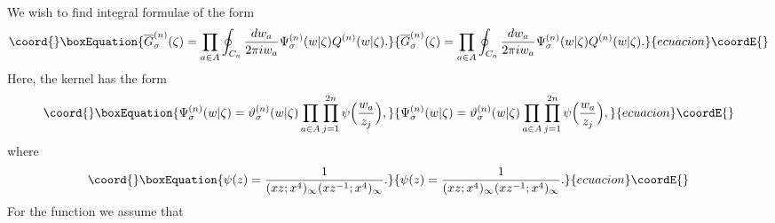 \documentclass[a4paper,10pt]{article}
\begin{document}
We wish to find integral formulae of the form 
\begin{equation}\coord{}\boxEquation{
\overline{G}_{\sigma}^{(n)} 
(\zeta)=\prod_{a\in A}\oint_{C_a} 
\dfrac{dw_a}{2\pi iw_a} 
\Psi_{\sigma}^{(n)} (w|\zeta )
Q^{(n)}(w|\zeta). 
\label{eq:G-form}
}{
\overline{G}_{\sigma}^{(n)} 
(\zeta)=\prod_{a\in A}\oint_{C_a} 
\dfrac{dw_a}{2\pi iw_a} 
\Psi_{\sigma}^{(n)} (w|\zeta )
Q^{(n)}(w|\zeta). 
}{ecuacion}\coordE{}\end{equation}
Here, the kernel has the form 
\begin{equation}\coord{}\boxEquation{
\Psi^{(n)}_\sigma (w| \zeta )=
\vartheta^{(n)}_\sigma (w | \zeta )
\prod_{a\in A}\prod_{j=1}^{2n} 
\psi \Bigl(\frac{w_{a}}{z_j}\Bigr),
\label{eq:df-Psi}
}{
\Psi^{(n)}_\sigma (w| \zeta )=
\vartheta^{(n)}_\sigma (w | \zeta )
\prod_{a\in A}\prod_{j=1}^{2n} 
\psi \Bigl(\frac{w_{a}}{z_j}\Bigr),
}{ecuacion}\coordE{}\end{equation}
where
\begin{equation}\coord{}\boxEquation{
\psi(z)=\frac{1}{(xz;x^4)_{\infty}
(xz^{-1};x^4)_{\infty}}. 
\label{eq:df-psi}
}{
\psi(z)=\frac{1}{(xz;x^4)_{\infty}
(xz^{-1};x^4)_{\infty}}. 
}{ecuacion}\coordE{}\end{equation}
For the function 
\coordHE{} 
we assume that
\end{document}
